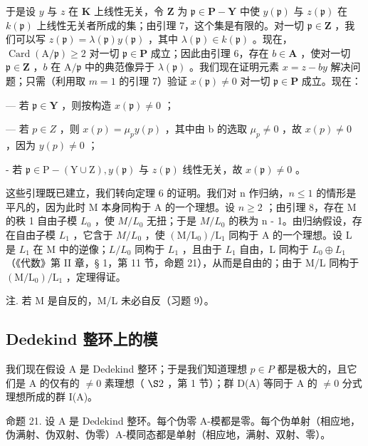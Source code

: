于是设 \(y\) 与 \(z\) 在 \(\mathbf{K}\) 上线性无关，令 \(\mathbf{Z}\) 为 \(\mathfrak{p} \in \mathbf{P} - \mathbf{Y}\) 中使 \(y(\mathfrak{p})\) 与 \(z(\mathfrak{p})\) 在 \(k(\mathfrak{p})\) 上线性无关者所成的集；由引理 7，这个集是有限的。对一切 \(\mathfrak{p} \in \mathbf{Z}\) ，我们可以写 \(z(\mathfrak{p}) = \lambda(\mathfrak{p})y(\mathfrak{p})\) ，其中 \(\lambda(\mathfrak{p}) \in k(\mathfrak{p})\) 。现在，\(\operatorname{Card}(\mathrm{A}/\mathfrak{p}) \geqslant 2\) 对一切 \(\mathfrak{p} \in \mathbf{P}\) 成立；因此由引理 6，存在 \(b \in \mathbf{A}\) ，使对一切 \(\mathfrak{p} \in \mathbf{Z}\) ，\(b\) 在 \(\mathrm{A}/\mathfrak{p}\) 中的典范像异于 \(\lambda(\mathfrak{p})\) 。我们现在证明元素 \(x = z - by\) 解决问题；只需（利用取 \(m = 1\) 的引理 7）验证 \(x(\mathfrak{p}) \neq 0\) 对一切 \(\mathfrak{p} \in \mathbf{P}\) 成立。现在：

--- 若 \(\mathfrak{p} \in \mathbf{Y}\) ，则按构造 \(x(\mathfrak{p}) \neq 0\) ；

--- 若 \(p \in Z\) ，则 \(x(p) = \mu_{p} y(p)\) ，其中由 b 的选取 \(\mu_{p} \neq 0\) ，故 \(x(p) \neq 0\) ，因为 \(y(p) \neq 0\) ；

- 若 \(\mathfrak{p} \in \mathrm{P} - (\mathrm{Y} \cup \mathrm{Z}), y(\mathfrak{p})\) 与 \(z(\mathfrak{p})\) 线性无关，故 \(x(\mathfrak{p}) \neq 0\) 。

这些引理既已建立，我们转向定理 6 的证明。我们对 n 作归纳，\(n \leqslant 1\) 的情形是平凡的，因为此时 M 本身同构于 A 的一个理想。设 \(n \geqslant 2\) ；由引理 8，存在 M 的秩 1 自由子模 \(L_{0}\) ，使 \(M/L_{0}\) 无扭；于是 \(M/L_{0}\) 的秩为 n - 1。由归纳假设，存在自由子模 \(L_{1}\) ，它含于 \(M/L_{0}\) ，使 \((\mathrm{M}/\mathrm{L}_{0})/\mathrm{L}_{1}\) 同构于 A 的一个理想。设 L 是 \(L_{1}\) 在 M 中的逆像；\(L/L_{0}\) 同构于 \(L_{1}\) ，且由于 \(L_{1}\) 自由，L 同构于 \(L_{0} \oplus L_{1}\) （《代数》第 II 章，§ 1，第 11 节，命题 21），从而是自由的；由于 M/L 同构于 \((\mathrm{M}/\mathrm{L}_{0})/\mathrm{L}_{1}\) ，定理得证。

注. 若 M 是自反的，M/L 未必自反（习题 9）。

\subsection{Dedekind 整环上的模}

我们现在假设 A 是 Dedekind 整环；于是我们知道理想 \(p \in P\) 都是极大的，且它们是 A 的仅有的 \(\neq 0\) 素理想（ \(\S 2\) ，第 1 节）；群 D(A) 等同于 A 的 \(\neq 0\) 分式理想所成的群 I(A)。

命题 21. 设 A 是 Dedekind 整环。每个伪零 A-模都是零。每个伪单射（相应地，伪满射、伪双射、伪零）A-模同态都是单射（相应地，满射、双射、零）。

